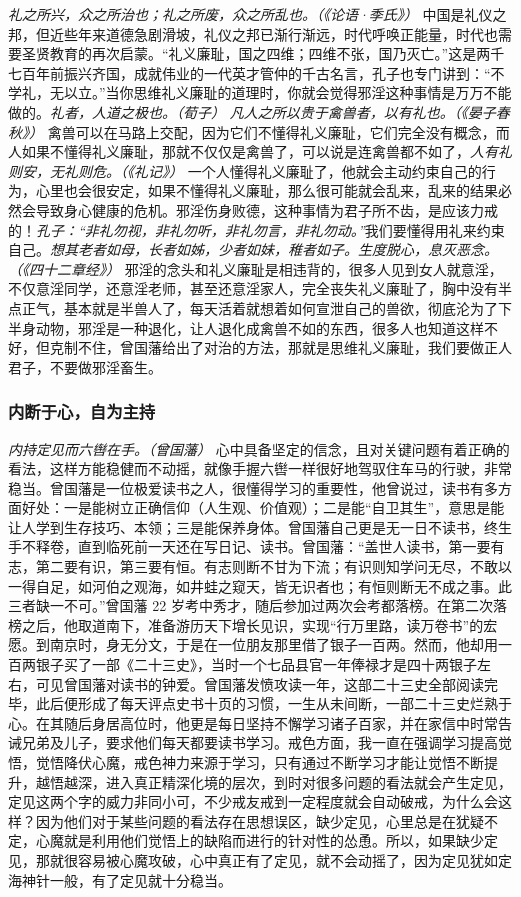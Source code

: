 \textit{礼之所兴，众之所治也；礼之所废，众之所乱也。（《论语·季氏》）} 中国是礼仪之邦，但近些年来道德急剧滑坡，礼仪之邦已渐行渐远，时代呼唤正能量，时代也需要圣贤教育的再次启蒙。“礼义廉耻，国之四维；四维不张，国乃灭亡。”这是两千七百年前振兴齐国，成就伟业的一代英才管仲的千古名言，孔子也专门讲到：“不学礼，无以立。”当你思维礼义廉耻的道理时，你就会觉得邪淫这种事情是万万不能做的。\textit{礼者，人道之极也。（荀子）} \textit{凡人之所以贵于禽兽者，以有礼也。（《晏子春秋》）} 禽兽可以在马路上交配，因为它们不懂得礼义廉耻，它们完全没有概念，而人如果不懂得礼义廉耻，那就不仅仅是禽兽了，可以说是连禽兽都不如了，\textit{人有礼则安，无礼则危。（《礼记》）} 一个人懂得礼义廉耻了，他就会主动约束自己的行为，心里也会很安定，如果不懂得礼义廉耻，那么很可能就会乱来，乱来的结果必然会导致身心健康的危机。邪淫伤身败德，这种事情为君子所不齿，是应该力戒的！\textit{孔子：“非礼勿视，非礼勿听，非礼勿言，非礼勿动。”}我们要懂得用礼来约束自己。\textit{想其老者如母，长者如姊，少者如妹，稚者如子。生度脱心，息灭恶念。（《四十二章经》）} 邪淫的念头和礼义廉耻是相违背的，很多人见到女人就意淫，不仅意淫同学，还意淫老师，甚至还意淫家人，完全丧失礼义廉耻了，胸中没有半点正气，基本就是半兽人了，每天活着就想着如何宣泄自己的兽欲，彻底沦为了下半身动物，邪淫是一种退化，让人退化成禽兽不如的东西，很多人也知道这样不好，但克制不住，曾国藩给出了对治的方法，那就是思维礼义廉耻，我们要做正人君子，不要做邪淫畜生。

\subsubsection{内断于心，自为主持}

\textit{内持定见而六辔在手。（曾国藩）} 心中具备坚定的信念，且对关键问题有着正确的看法，这样方能稳健而不动摇，就像手握六辔一样很好地驾驭住车马的行驶，非常稳当。曾国藩是一位极爱读书之人，很懂得学习的重要性，他曾说过，读书有多方面好处：一是能树立正确信仰（人生观、价值观）；二是能“自卫其生”，意思是能让人学到生存技巧、本领；三是能保养身体。曾国藩自己更是无一日不读书，终生手不释卷，直到临死前一天还在写日记、读书。曾国藩：“盖世人读书，第一要有志，第二要有识，第三要有恒。有志则断不甘为下流；有识则知学问无尽，不敢以一得自足，如河伯之观海，如井蛙之窥天，皆无识者也；有恒则断无不成之事。此三者缺一不可。”曾国藩 22 岁考中秀才，随后参加过两次会考都落榜。在第二次落榜之后，他取道南下，准备游历天下增长见识，实现“行万里路，读万卷书”的宏愿。到南京时，身无分文，于是在一位朋友那里借了银子一百两。然而，他却用一百两银子买了一部《二十三史》，当时一个七品县官一年俸禄才是四十两银子左右，可见曾国藩对读书的钟爱。曾国藩发愤攻读一年，这部二十三史全部阅读完毕，此后便形成了每天评点史书十页的习惯，一生从未间断，一部二十三史烂熟于心。在其随后身居高位时，他更是每日坚持不懈学习诸子百家，并在家信中时常告诫兄弟及儿子，要求他们每天都要读书学习。戒色方面，我一直在强调学习提高觉悟，觉悟降伏心魔，戒色神力来源于学习，只有通过不断学习才能让觉悟不断提升，越悟越深，进入真正精深化境的层次，到时对很多问题的看法就会产生定见，定见这两个字的威力非同小可，不少戒友戒到一定程度就会自动破戒，为什么会这样？因为他们对于某些问题的看法存在思想误区，缺少定见，心里总是在犹疑不定，心魔就是利用他们觉悟上的缺陷而进行的针对性的怂恿。所以，如果缺少定见，那就很容易被心魔攻破，心中真正有了定见，就不会动摇了，因为定见犹如定海神针一般，有了定见就十分稳当。

